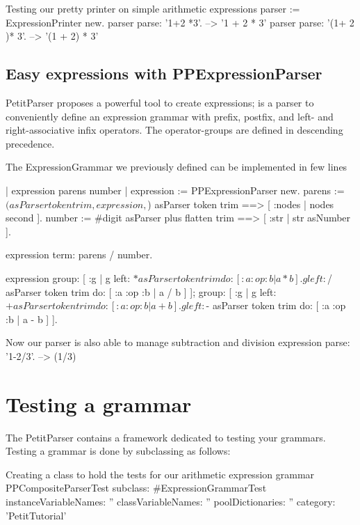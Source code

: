 \documentclass[a4paper,10pt,twoside]{book}
\begin{document}
\begin{script}{Testing our pretty printer on simple arithmetic expressions}
parser := ExpressionPrinter new.
parser parse: '1+2 *3'.          --> '1 + 2 * 3'
parser parse: '(1+ 2 )* 3'.      --> '(1 + 2) * 3'
\end{script}

\subsection{Easy expressions with PPExpressionParser}

PetitParser proposes a powerful tool to create expressions;
 is a parser to conveniently define an expression
grammar with prefix, postfix, and left- and right-associative infix
operators. The operator-groups are defined in descending precedence.

\begin{script}{The ExpressionGrammar we previously defined can be implemented in few lines}

| expression parens number |
expression := PPExpressionParser new.
parens := $( asParser token trim , expression , $) asParser token trim
==> [ :nodes | nodes second ].
number := #digit asParser plus flatten trim ==> [ :str | str asNumber ].

expression term: parens / number.

expression
  group: [ :g |
    g left: $* asParser token trim do: [ :a :op :b | a * b ].
    g left: $/ asParser token trim do: [ :a :op :b | a / b ] ];
  group: [ :g |
    g left: $+ asParser token trim do: [ :a :op :b | a + b ].
    g left: $- asParser token trim do: [ :a :op :b | a - b ] ].
\end{script}

\begin{script}{Now our parser is also able to manage subtraction and division}
expression parse: '1-2/3'.       --> (1/3)
\end{script}


\section{Testing a grammar}

The PetitParser contains a framework dedicated to testing your
grammars. Testing a grammar is done by subclassing
 as follows:

\begin{script}{Creating a class to hold the tests for our arithmetic expression grammar}
PPCompositeParserTest subclass: #ExpressionGrammarTest
  instanceVariableNames: ''
  classVariableNames: ''
  poolDictionaries: ''
  category: 'PetitTutorial'
\end{script}
\end{document}
